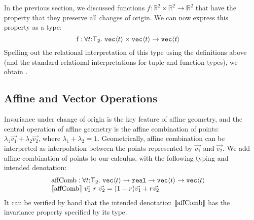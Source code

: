 In the previous section, we discussed functions $f : \mathbb{R}^2
\times \mathbb{R}^2 \to \mathbb{R}^2$ that have the property that they
preserve all changes of origin. We can now express this property as a
type:
\begin{displaymath}
  \mathrm{f} : \forall t \mathord: \SynTransl_2.\ \tyPrim{vec}{t} \times \tyPrim{vec}{t} \to \tyPrim{vec}{t}
\end{displaymath}
Spelling out the relational interpretation of this type using the
definitions above (and the standard relational interpretations for
tuple and function types), we obtain
.

\subsection{Affine and Vector Operations}
\label{sec:affine-vector-ops}

Invariance under change of origin is the key feature of affine
geometry, and the central operation of affine geometry is the affine
combination of points: $\lambda_1\vec{v_1} + \lambda_2\vec{v_2}$,
where $\lambda_1 + \lambda_2 = 1$. Geometrically, affine combination
can be interpreted as interpolation between the points represented by
$\vec{v_1}$ and $\vec{v_2}$. We add affine combination of points to
our calculus, with the following typing and intended denotation:
\begin{displaymath}
  \begin{array}{l}
    \mathrm{affComb} :\forall t \mathord: \mathsf{T}_2.\ \texttt{vec}\langle t \rangle \to \texttt{real} \to \texttt{vec}\langle t \rangle \to \texttt{vec}\langle t \rangle \\
    \llbracket \mathrm{affComb} \rrbracket\ \vec{v_1}\ r\ \vec{v_2} = (1-r)\vec{v_1} + r\vec{v_2}
  \end{array}
\end{displaymath}
It can be verified by hand that the intended denotation
$\llbracket \mathrm{affComb} \rrbracket$ has the invariance property specified by its
type.

